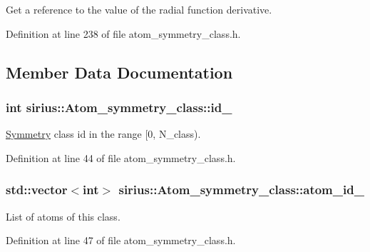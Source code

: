 Get a reference to the value of the radial function derivative. 



Definition at line 238 of file atom\+\_\+symmetry\+\_\+class.\+h.



\subsection{Member Data Documentation}
\hypertarget{classsirius_1_1_atom__symmetry__class_aa4c86581251ec529aed2437f1a370b30}{}
\subsubsection[{id\+\_\+}]{\setlength{\rightskip}{0pt plus 5cm}int sirius\+::\+Atom\+\_\+symmetry\+\_\+class\+::id\+\_\+\hspace{0.3cm}{\ttfamily [private]}}\label{classsirius_1_1_atom__symmetry__class_aa4c86581251ec529aed2437f1a370b30}


\hyperlink{classsirius_1_1_symmetry}{Symmetry} class id in the range \mbox{[}0, N\+\_\+class). 



Definition at line 44 of file atom\+\_\+symmetry\+\_\+class.\+h.

\hypertarget{classsirius_1_1_atom__symmetry__class_a1a554889233bd3be37d1ae94071e6fed}{}
\subsubsection[{atom\+\_\+id\+\_\+}]{\setlength{\rightskip}{0pt plus 5cm}std\+::vector$<$int$>$ sirius\+::\+Atom\+\_\+symmetry\+\_\+class\+::atom\+\_\+id\+\_\+\hspace{0.3cm}{\ttfamily [private]}}\label{classsirius_1_1_atom__symmetry__class_a1a554889233bd3be37d1ae94071e6fed}


List of atoms of this class. 



Definition at line 47 of file atom\+\_\+symmetry\+\_\+class.\+h.

